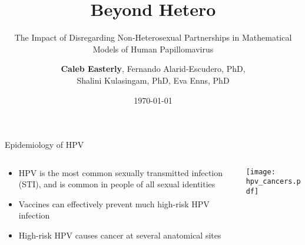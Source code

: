 \documentclass[aspectratio=169]{beamer}
\title{\textbf{Beyond Hetero}}
\subtitle{The Impact of Disregarding Non-Heterosexual Partnerships in Mathematical Models of Human Papillomavirus}
\author[Caleb Easterly]{\textbf{Caleb Easterly\inst{1}}, Fernando Alarid-Escudero, PhD\inst{1}, \\ Shalini Kulasingam, PhD\inst{2}, Eva Enns, PhD\inst{1}}
\date{\today}
\institute
{
  \inst{1}%
  Division of Health Policy and Management\\University of Minnesota School of Public Health
  \and
  \vskip-2mm
  \inst{2}%
  Division of Epidemiology\\University of Minnesota School of Public Health
}
\begin{document}
\begin{frame}
\titlepage
\end{frame}

% 

\begin{frame}{Epidemiology of HPV}
    \begin{columns}[T]
        \begin{column}{0.5\textwidth}
            \begin{itemize}
                \pause
                \item HPV is the most common sexually transmitted infection (STI), and is common in people of all sexual identities
                \pause
                \item Vaccines can effectively prevent much high-risk HPV infection
                \pause
                \item High-risk HPV causes cancer at several anatomical sites
            \end{itemize}
        \end{column}
        \begin{column}{0.4\textwidth}
            \texttt{[image: hpv\_cancers.pdf]}
        \end{column}
    \end{columns}
\end{frame}
\end{document}
